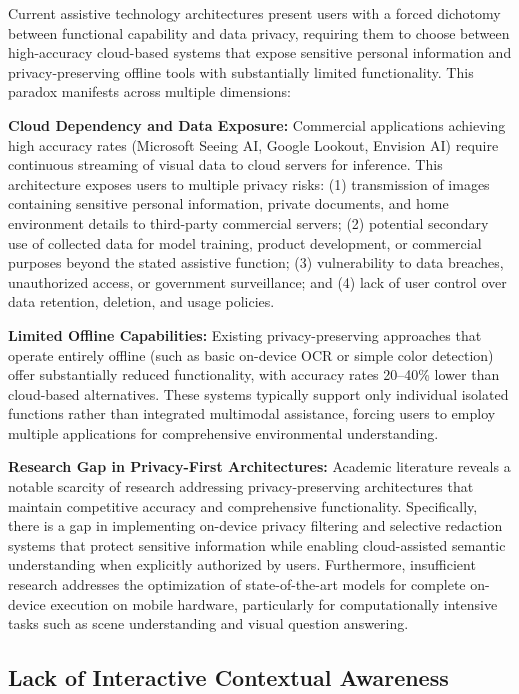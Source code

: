 \documentclass[a4paper]{report}
\begin{document}
Current assistive technology architectures present users with a forced dichotomy between functional capability and data privacy, requiring them to choose between high-accuracy cloud-based systems that expose sensitive personal information and privacy-preserving offline tools with substantially limited functionality. This paradox manifests across multiple dimensions:

\textbf{Cloud Dependency and Data Exposure:} Commercial applications achieving high accuracy rates (Microsoft Seeing AI, Google Lookout, Envision AI) require continuous streaming of visual data to cloud servers for inference. This architecture exposes users to multiple privacy risks: (1) transmission of images containing sensitive personal information, private documents, and home environment details to third-party commercial servers; (2) potential secondary use of collected data for model training, product development, or commercial purposes beyond the stated assistive function; (3) vulnerability to data breaches, unauthorized access, or government surveillance; and (4) lack of user control over data retention, deletion, and usage policies.

\textbf{Limited Offline Capabilities:} Existing privacy-preserving approaches that operate entirely offline (such as basic on-device OCR or simple color detection) offer substantially reduced functionality, with accuracy rates 20--40\% lower than cloud-based alternatives. These systems typically support only individual isolated functions rather than integrated multimodal assistance, forcing users to employ multiple applications for comprehensive environmental understanding.

\textbf{Research Gap in Privacy-First Architectures:} Academic literature reveals a notable scarcity of research addressing privacy-preserving architectures that maintain competitive accuracy and comprehensive functionality. Specifically, there is a gap in implementing on-device privacy filtering and selective redaction systems that protect sensitive information while enabling cloud-assisted semantic understanding when explicitly authorized by users. Furthermore, insufficient research addresses the optimization of state-of-the-art models for complete on-device execution on mobile hardware, particularly for computationally intensive tasks such as scene understanding and visual question answering.

\subsection{Lack of Interactive Contextual Awareness}
\end{document}
